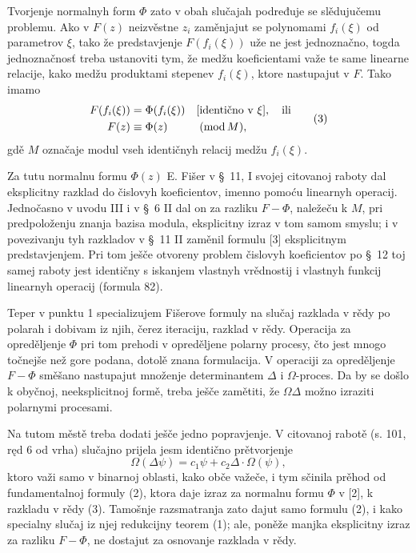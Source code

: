 \documentclass[11pt]{article}
\providecommand{\modu}[1]{\;(\operatorname{mod} #1)}
\begin{document}
Tvorjenje normalnyh form \(\Phi\) zato v obah slučajah podređuje se slědujučemu problemu. Ako v \(F(z)\) neizvěstne \(z_i\) zaměnjajut se polynomami \(f_i(\xi)\) od parametrov \(\xi\), tako že predstavjenje \(F(f_i(\xi))\) uže ne jest jednoznačno, togda jednoznačnosť treba ustanoviti tym, že medžu koeficientami važe te same linearne relacije, kako medžu produktami stepenev \(f_i(\xi)\), ktore nastupajut v \(F\). Tako imamo
\begin{equation}
\begin{aligned}
        F(f_i(\xi))&=\Phi(f_i(\xi))&&[\text{identično v }\xi],\quad\text{ili}\notag\\
        F(z)&\equiv\Phi(z)&&\modu{M},
\end{aligned}
\tag{3}
\end{equation}
gdě \(M\) označaje modul vseh identičnyh relacij medžu \(f_i(\xi)\).

Za tutu normalnu formu \(\Phi(z)\) E. Fišer v \S~11, I svojej citovanoj raboty dal eksplicitny razklad do čislovyh koeficientov, imenno pomoću linearnyh operacij. Jednočasno v uvodu III i v \S~6 II dal on za razliku \(F-\Phi\), naležeču k \(M\), pri predpoloženju znanja bazisa modula, eksplicitny izraz v tom samom smyslu; i v povezivanju tyh razkladov v \S~11 II zaměnil formulu [3] eksplicitnym predstavjenjem. Pri tom ješče otvoreny problem čislovyh koeficientov po \S~12 toj samej raboty jest identičny s iskanjem vlastnyh vrědnostij i vlastnyh funkcij linearnyh operacij (formula 82).

Teper v punktu 1 specializujem Fišerove formuly na slučaj razklada v rědy po polarah i dobivam iz njih, čerez iteraciju, razklad v rědy. Operacija za opreděljenje \(\Phi\) pri tom prehodi v opreděljene polarny procesy, čto jest mnogo točnejše než gore podana, dotolě znana formulacija. V operaciji za opreděljenje \(F-\Phi\) směšano nastupajut množenje determinantem \(\Delta\) i \(\Omega\)-proces. Da by se došlo k obyčnoj, neeksplicitnoj formě, treba ješče zamětiti, že \(\Omega\Delta\) možno izraziti polarnymi procesami.

Na tutom městě treba dodati ješče jedno popravjenje. V citovanoj rabotě (s. 101, ręd 6 od vrha) slučajno prijela jesm identično prětvorjenje
\[
        \Omega(\Delta\psi)=c_1\psi+c_2\Delta\cdot\Omega(\psi),
\]
ktoro važi samo v binarnoj oblasti, kako obče važeče, i tym sčinila prěhod od fundamentalnoj formuly (2), ktora daje izraz za normalnu formu \(\Phi\) v [2], k razkladu v rědy (3). Tamošnje razsmatranja zato dajut samo formulu (2), i kako specialny slučaj iz njej redukcijny teorem (1); ale, poněže manjka eksplicitny izraz za razliku \(F-\Phi\), ne dostajut za osnovanje razklada v rědy.
\end{document}

